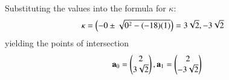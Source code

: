 \documentclass[journal]{IEEEtran}
\begin{document}
Substituting the values into the formula for $\kappa$:
\begin{align}
\kappa &= \left(-0 \pm \sqrt{0^2 - (-18)(1)}\right) = 3\sqrt{2},-3\sqrt{2}
\end{align}
yielding the points of intersection
\begin{align}
\mathbf{a}_0 =  \begin{pmatrix}2 \\ 3\sqrt{2}\end{pmatrix},\mathbf{a}_1 =  \begin{pmatrix}2 \\ -3\sqrt{2}\end{pmatrix}
\end{align}
\end{document}
